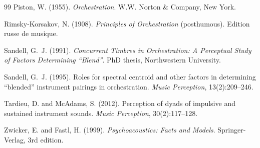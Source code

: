 \documentclass[12pt,a4paper]{article}
\begin{document}
\begin{thebibliography}{99}
Piston, W. (1955).
\newblock \emph{Orchestration}.
\newblock W.W. Norton \& Company, New York.

Rimsky-Korsakov, N. (1908).
\newblock \emph{Principles of Orchestration} (posthumous).
\newblock Edition russe de musique.

Sandell, G.~J. (1991).
\newblock \emph{Concurrent Timbres in Orchestration: A Perceptual Study of
  Factors Determining ``Blend''}.
\newblock PhD thesis, Northwestern University.

Sandell, G.~J. (1995).
\newblock Roles for spectral centroid and other factors in determining
  ``blended'' instrument pairings in orchestration.
\newblock \emph{Music Perception}, 13(2):209--246.

Tardieu, D. and McAdams, S. (2012).
\newblock Perception of dyads of impulsive and sustained instrument sounds.
\newblock \emph{Music Perception}, 30(2):117--128.

Zwicker, E. and Fastl, H. (1999).
\newblock \emph{Psychoacoustics: Facts and Models}.
\newblock Springer-Verlag, 3rd edition.

\end{thebibliography}
\end{document}
